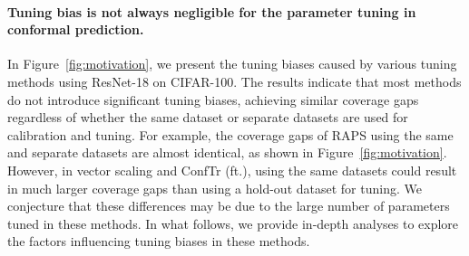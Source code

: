 \documentclass{article}
\newcommand{\1}{\mathbbm{1}}
\theoremstyle{plain}
\theoremstyle{definition}
\theoremstyle{remark}
\begin{document}
\paragraph{Tuning bias is not always negligible for the parameter tuning in conformal prediction.}
In Figure~\ref{fig:motivation}, we present the tuning biases caused by various tuning methods using ResNet-18 on CIFAR-100.  
The results indicate that most methods do not introduce significant tuning biases, achieving similar coverage gaps regardless of whether the same dataset or separate datasets are used for calibration and tuning. 
For example, the coverage gaps of RAPS using the same and separate datasets are almost identical, as shown in Figure~\ref{fig:motivation}. 
However, in vector scaling and ConfTr (ft.), using the same datasets could result in much larger coverage gaps than using a hold-out dataset for tuning. 
We conjecture that these differences may be due to the large number of parameters tuned in these methods. 
In what follows, we provide in-depth analyses to explore the factors influencing tuning biases in these methods.
\end{document}
